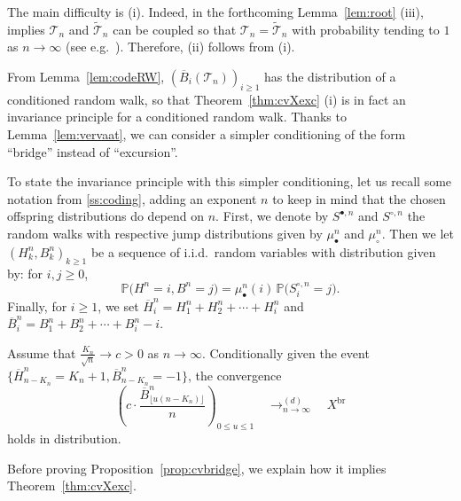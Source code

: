 \documentclass[AHL,XML,longabstracts,Unicode]{cedram}
\def\mubn{\mu_{\bullet}^{n}}
\def\mucn{\mu_{\circ}^{n}}
\def\Sbn{S^{\bullet,n}}
\def\Scn{S^{\circ,n}}
\def\oB{\overline{B}}
\def \Xbr{X^{\mathrm{br}}}
\def\tTs{\tilde{\Ts}}
\def\Ts{\mathscr{T}}
\newcommand\Prb[1]{\mathbb{P}\big(#1\big)}
\begin{document}
The main difficulty is (i). Indeed, in the forthcoming Lemma~\ref{lem:root} (iii),
implies $\Ts_{n}$ and $\tTs _{n}$ can be coupled so that $\Ts_{n}=\tTs_{n}$
with probability tending to $1$ as $ n \rightarrow \infty$ (see e.g.~\cite{Lin92}).
Therefore, (ii) follows from (i).


From Lemma~\ref{lem:codeRW}, $(\oB_i(\Ts_{n}))_{i \ge 1}$ has the distribution of a conditioned random walk,
so that Theorem~\ref{thm:cvXexc} (i) is in fact an invariance principle for a conditioned random walk.
Thanks to Lemma~\ref{lem:vervaat},
we can consider a simpler conditioning of the form ``bridge'' instead of ``excursion''.

To state the invariance principle with this simpler conditioning, let us
recall some notation from \cref{ss:coding}, adding an exponent $n$ to keep in mind that the
chosen offspring distributions do depend on $n$.
First, we  denote by $\Sbn$ and $\Scn$ the random walks with respective jump distributions given by $\mubn$ and $\mucn$.
Then we let $(H^{n}_{k},B^{n}_{k})_{k \geq 1}$ be a sequence of i.i.d.~random variables with distribution
given by: for $i, j \geq 0$,  \[ \Prb{H^{n}=i,B^{n}=j}=\mubn(i) \, \Prb{\Scn_{i}=j}.\]
Finally, for $i \ge 1$, we set $\overline{H}^{n}_{i}=H^{n}_{1}+H^{n}_{2}+ \cdots+H^{n}_{i}$ and  $\oB^{n}_{i}=B^{n}_{1}+B^{n}_{2}+ \cdots+B^{n}_{i}-i$.




\begin{proposition}
\label{prop:cvbridge}
Assume that $ \tfrac{K_{n}}{\sqrt{n}} \rightarrow c>0$ as $n \rightarrow \infty$. Conditionally given the event
$ \{\overline{H}^{n}_{n-K_{n}}=K_{n}+1, \oB^{n}_{n-K_{n}}=-1 \}$, the convergence
\[  \left(   c \cdot  \frac{\oB^{n}_{\lfloor u (n-K_{n}) \rfloor}}{ n} \right)_{0 \leq u \leq 1}  \quad \mathop{\longrightarrow}^{(d)}_{n \rightarrow \infty} \quad \Xbr\]
holds in distribution.
\end{proposition}


Before proving Proposition~\ref{prop:cvbridge}, we explain how it implies Theorem~\ref{thm:cvXexc}.
\end{document}
